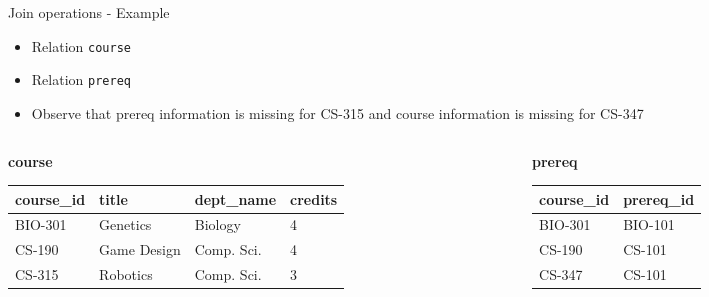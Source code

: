 \documentclass[aspectratio=169, xcolor=dvipsnames]{beamer}
\begin{document}
\begin{frame}{Join operations - Example}
    \begin{itemize}
        \item Relation \texttt{course}
        \item Relation \texttt{prereq}
        \item Observe that prereq information is missing for CS-315 and course information is missing for CS-347
    \end{itemize}
    \begin{columns}
        \begin{column}{0.65\textwidth}
            \textbf{course}
            \begin{center}
                \begin{adjustbox}{max width=\textwidth}
                \begin{tabular}{|l|l|l|l|}
                \hline
                \textbf{course\_id} & \textbf{title} & \textbf{dept\_name} & \textbf{credits} \\ \hline
                BIO-301 & Genetics & Biology & 4 \\ \hline
                CS-190 & Game Design & Comp. Sci. & 4 \\ \hline
                CS-315 & Robotics & Comp. Sci. & 3 \\ \hline
                \end{tabular}
                \end{adjustbox}
            \end{center}
        \end{column}
        \begin{column}{0.35\textwidth}
            \textbf{prereq}
            \begin{center}
                \begin{adjustbox}{max width=\textwidth}
                \begin{tabular}{|l|l|}
                \hline
                \textbf{course\_id} & \textbf{prereq\_id} \\ \hline
                BIO-301 & BIO-101 \\ \hline
                CS-190 & CS-101 \\ \hline
                CS-347 & CS-101 \\ \hline
                \end{tabular}
                \end{adjustbox}
            \end{center}
        \end{column}
    \end{columns}
\end{frame}
\end{document}
